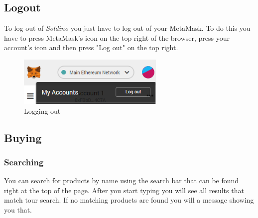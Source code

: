	\subsection{Logout}
	To log out of \textit{Soldino} you just have to log out of 
	your MetaMask. To do this you have to press MetaMask's icon on the top 
	right of the browser, press your account's icon and then press "Log out"
	on the top right.
	\begin{figure}[H]
		\includegraphics[width=7cm]{res/images/logout_metamask.png}
		\centering
		\caption{Logging out}
	\end{figure}
	\subsection{Buying}
	\subsubsection{Searching}
	You can search for products by name using the search bar that can be found 
	right at the top of the page. After you start typing you will see all 
	results that match tour search. If no matching products are found you will 
	a message showing you that.
